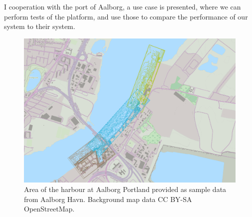 I cooperation with the port of Aalborg, a use case is presented, where we can perform tests of the platform, and use those to compare the performance of our system to their system.
\begin{figure}[htbp]
	\centering
	\includegraphics[width=\textwidth]{fig/use-case-data}
	\caption{Area of the harbour at Aalborg Portland provided as sample
	data from Aalborg Havn. Background map data CC BY-SA OpenStreetMap.}
	\label{fig:diffforms}
\end{figure}

